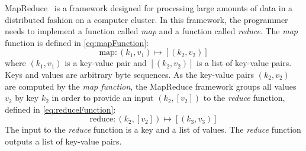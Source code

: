 MapReduce~\citep{dean-ghemawat:2008:ACM} is a framework designed for processing
large amounts of data in a distributed fashion on a computer cluster. In this
framework, the programmer needs to implement a function called \emph{map} and
a function called \emph{reduce}. The \emph{map} function is defined in
\autoref{eq:mapFunction}:
%
\begin{equation}
  \text{map} : (k_1, v_1) \longmapsto [(k_2, v_2)]
  \label{eq:mapFunction}
\end{equation}
%
where $(k_1, v_1)$ is a key-value pair and $[(k_2, v_2)]$ is a list of
key-value pairs. Keys and values are arbitrary byte sequences. As the key-value
pairs $(k_2, v_2)$ are computed by the \emph{map function}, the MapReduce framework groups all values $v_2$ by key $k_2$ in order
to provide an input $(k_2, [v_2])$ to the \emph{reduce} function, defined in
\autoref{eq:reduceFunction}:
%
\begin{equation}
  \text{reduce} : (k_2, [v_2]) \longmapsto [(k_3, v_3)]
  \label{eq:reduceFunction}
\end{equation}
%
The input to the \emph{reduce} function is a key and a list of values. The
\emph{reduce} function outputs a list of key-value pairs.

